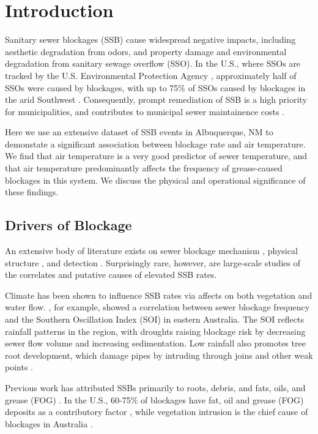 \documentclass[letterpaper,12pt]{article}
\begin{document}
\section{Introduction}
Sanitary sewer blockages (SSB) cause widespread negative impacts, including
aesthetic degradation from odors, and property damage and environmental
degradation from sanitary sewage overflow (SSO).  In the U.S., where SSOs are
tracked by the U.S. Environmental Protection Agency \cite{epa2004local},
approximately half of SSOs were caused by blockages, with up to 75\% of SSOs
caused by blockages in the arid Southwest \cite{epa2004report}.
Consequently, prompt remediation of SSB is a high priority for municipalities,
and contributes to municipal sewer maintainence costs
\cite{maintainence-cost}.

Here we use an extensive dataset of SSB events in
Albuquerque, NM to demonstate a significant association
between blockage rate and air temperature.
We find that air temperature is a very good predictor 
of sewer temperature, and that
air temperature predominantly affects the 
frequency of grease-caused blockages in this system.
We discuss the physical and operational significance of 
these findings.

\subsection{Drivers of Blockage}
An extensive body of literature exists on sewer blockage 
mechanism \citep{??}, physical structure \citep{??}, and 
detection \citep{??}.  Surprisingly rare, however, are 
large-scale 
studies of the correlates and putative causes of elevated
SSB rates. 

Climate has been shown to influence SSB rates via affects on both vegetation and water
flow. \cite{Marlow2011}, for example, showed a correlation between sewer
blockage frequency and the Southern Oscillation Index (SOI) in eastern
Australia. The SOI reflects rainfall patterns in the region, with droughts
raising blockage risk by decreasing sewer flow volume and increasing
sedimentation. Low rainfall also promotes tree root development, which damage
pipes by intruding through joins and other weak points \cite{Desilva2011}.

Previous work has attributed SSBs primarily to roots, debris, and fats, oils,
and grease (FOG) \cite{epa2004report}.  In the U.S., 60-75\% of blockages
have fat, oil and grease (FOG) deposits as a contributory factor
\cite{Keener2008}, while vegetation intrusion is the chief cause of
blockages in Australia \cite{Marlow2011}.
\end{document}
